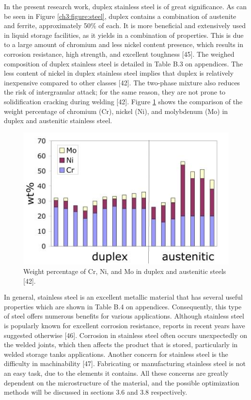 \documentclass[12pt]{report}
\begin{document}
In the present research work, duplex stainless steel is of great significance. As can be seen in Figure \ref{ch3:figure:steel}, duplex contains a combination of austenite and ferrite, approximately 50\% of each. It is more beneficial and extensively used in liquid storage facilities, as it yields in a combination of properties. This is due to a large amount of chromium and less nickel content presence, which results in corrosion resistance, high strength, and excellent toughness [45]. The weighed composition of duplex stainless steel is detailed in Table B.3 on appendices. The less content of nickel in duplex stainless steel implies that duplex is relatively inexpensive compared to other classes [42]. The two-phase mixture also reduces the risk of intergranular attack; for the same reason, they are not prone to solidification cracking during welding [42]. Figure \ref{ch3:figure:weight} shows the comparison of the weight percentage of chromium (Cr), nickel (Ni), and molybdenum (Mo) in duplex and austenitic stainless steel.
 
\begin{figure}[H]
    \centering
    \includegraphics[width=.65\textwidth]{weight_percentages.jpg}
    \caption{Weight percentage of Cr, Ni, and Mo in duplex and austenitic steels [42].}
    \label{ch3:figure:weight}
\end{figure}

In general, stainless steel is an excellent metallic material that has several useful properties which are shown in Table B.4 on appendices. Consequently, this type of steel offers numerous benefits for various applications. Although stainless steel is popularly known for excellent corrosion resistance, reports in recent years have suggested otherwise [46]. Corrosion in stainless steel often occurs unexpectedly on the welded joints, which then affects the product that is stored, particularly in welded storage tanks applications. Another concern for stainless steel is the difficulty in machinability [47]. Fabricating or manufacturing stainless steel is not an easy task, due to the elements it contains. All these concerns are greatly dependent on the microstructure of the material, and the possible optimization methods will be discussed in sections 3.6 and 3.8 respectively.
\end{document}
